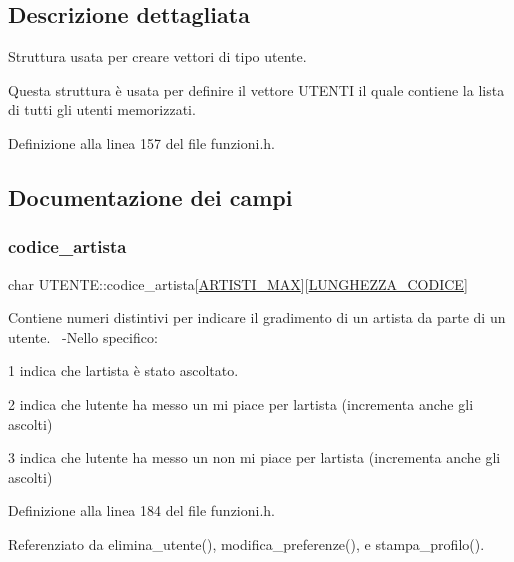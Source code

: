\subsection{Descrizione dettagliata}
Struttura usata per creare vettori di tipo utente. 

Questa struttura è usata per definire il vettore U\+T\+E\+N\+TI il quale contiene la lista di tutti gli utenti memorizzati. 

Definizione alla linea 157 del file funzioni.\+h.



\subsection{Documentazione dei campi}
\mbox{\label{struct_u_t_e_n_t_e_a0c2bc40343dd678b5033f5c7084dfb43}} 
\subsubsection{\texorpdfstring{codice\+\_\+artista}{codice\_artista}}
{\footnotesize\ttfamily char U\+T\+E\+N\+T\+E\+::codice\+\_\+artista\mbox{[}\hyperlink{funzioni_8h_af17e5297d3cc4c2db33d467698a1b9c2}{A\+R\+T\+I\+S\+T\+I\+\_\+\+M\+AX}\mbox{]}\mbox{[}\hyperlink{funzioni_8h_a15beac41f998f4495a79396160235665}{L\+U\+N\+G\+H\+E\+Z\+Z\+A\+\_\+\+C\+O\+D\+I\+CE}\mbox{]}}

Contiene numeri distintivi per indicare il gradimento di un artista da parte di un utente.~\newline
-\/\+Nello specifico\+:
\begin{DoxyEnumerate}
\item 1 indica che l\textquotesingle{}artista è stato ascoltato.
\item 2 indica che l\textquotesingle{}utente ha messo un mi piace per l\textquotesingle{}artista (incrementa anche gli ascolti)
\item 3 indica che l\textquotesingle{}utente ha messo un non mi piace per l\textquotesingle{}artista (incrementa anche gli ascolti) 
\end{DoxyEnumerate}

Definizione alla linea 184 del file funzioni.\+h.



Referenziato da elimina\+\_\+utente(), modifica\+\_\+preferenze(), e stampa\+\_\+profilo().

